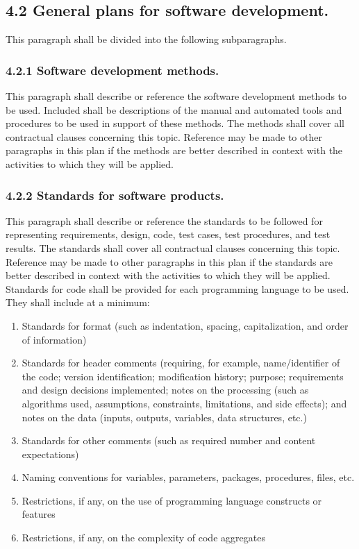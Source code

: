 \subsection{4.2 General plans for software development.}

This paragraph shall be divided into the following subparagraphs.

\subsubsection{4.2.1 Software development methods.}

This paragraph shall describe or reference the software development
methods to be used. Included shall be descriptions of the manual and
automated tools and procedures to be used in support of these methods.
The methods shall cover all contractual clauses concerning this topic.
Reference may be made to other paragraphs in this plan if the methods
are better described in context with the activities to which they will
be applied.

\subsubsection{4.2.2 Standards for software products.}

This paragraph shall describe or reference the standards to be followed
for representing requirements, design, code, test cases, test
procedures, and test results. The standards shall cover all contractual
clauses concerning this topic. Reference may be made to other paragraphs
in this plan if the standards are better described in context with the
activities to which they will be applied. Standards for code shall be
provided for each programming language to be used. They shall include at
a minimum:

\begin{enumerate}
\itemsep1pt\parskip0pt
\item
  Standards for format (such as indentation, spacing, capitalization,
  and order of information)
\item
  Standards for header comments (requiring, for example, name/identifier
  of the code; version identification; modification history; purpose;
  requirements and design decisions implemented; notes on the processing
  (such as algorithms used, assumptions, constraints, limitations, and
  side effects); and notes on the data (inputs, outputs, variables, data
  structures, etc.)
\item
  Standards for other comments (such as required number and content
  expectations)
\item
  Naming conventions for variables, parameters, packages, procedures,
  files, etc.
\item
  Restrictions, if any, on the use of programming language constructs or
  features
\item
  Restrictions, if any, on the complexity of code aggregates
\end{enumerate}

